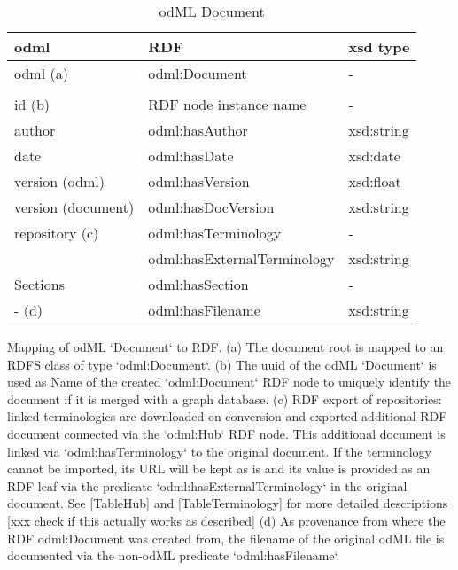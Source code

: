 \documentclass{article}
\begin{document}
\begin{table}
\begin{threeparttable}
\caption{odML Document}
\begin{tabular}{l|l|l}
    odml                    & RDF                                 & xsd type \\
\hline
    odml (a)                & odml:Document                       & - \\
                            & & \\
    id (b)                  & RDF node instance name              & - \\
    author                  & odml:hasAuthor                      & xsd:string \\
    date                    & odml:hasDate                        & xsd:date \\
    version (odml)          & odml:hasVersion                     & xsd:float \\
    version (document)      & odml:hasDocVersion                  & xsd:string \\
    repository (c)          & odml:hasTerminology                 & - \\
                            & odml:hasExternalTerminology         & xsd:string \\
    Sections                & odml:hasSection                     & - \\
    - (d)                   & odml:hasFilename                    & xsd:string \\
\end{tabular}
\begin{tablenotes}
\small
\item Mapping of odML `Document` to RDF. (a) The document root is mapped to an
RDFS class of type `odml:Document`. (b) The uuid of the odML `Document` is used as
Name of the created `odml:Document` RDF node to uniquely identify the document if it is
merged with a graph database. (c) RDF export of repositories: linked terminologies are
downloaded on conversion and exported additional RDF document connected via the `odml:Hub`
RDF node. This additional document is linked via `odml:hasTerminology` to the original
document. If the terminology cannot be imported, its URL will be kept as is and its
value is provided as an RDF leaf via the predicate `odml:hasExternalTerminology` in
the original document. See [TableHub] and [TableTerminology] for more detailed descriptions
[xxx check if this actually works as described] (d) As provenance from where the RDF
odml:Document was created from, the filename of the original odML file is documented via
the non-odML predicate `odml:hasFilename`.
\end{tablenotes}
\end{threeparttable}
\end{table}
\end{document}
